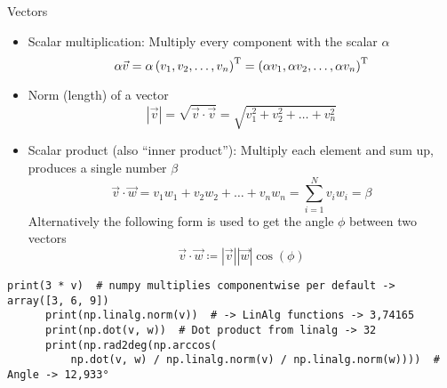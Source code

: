   \begin{frame}[fragile]{Vectors}
    \begin{itemize}
      \item Scalar multiplication:
        Multiply every component with the scalar $\alpha$
        \begin{equation*}
          \alpha \vec{v} =
            \alpha \left(v_1, v_2, \dots, v_n\right)^{\text{T}} =
            \left(\alpha v_1, \alpha v_2, \dots, \alpha v_n\right)^{\text{T}}
        \end{equation*}
      \item Norm (length) of a vector
        \begin{equation*}
          |\vec{v}| = \sqrt{\vec{v}\cdot \vec{v}} =
            \sqrt{v_1^2 + v_2^2 + \dots + v_n^2}
        \end{equation*}
      \item Scalar product (also \enquote{inner product}):
        Multiply each element and sum up, produces a single number $\beta$
        \begin{equation*}
          \vec{v}\cdot \vec{w} =
            v_1 w_1 + v_2 w_2 + \dots + v_n w_n =
            \sum_{i=1}^{N} v_i w_i = \beta
        \end{equation*}
        Alternatively the following form is used to get the angle $\phi$
          between two vectors
        \begin{equation*}
          \vec{v}\cdot \vec{w} \coloneqq |\vec{v}||\vec{w}|\cos(\phi)
        \end{equation*}
    \end{itemize}
    \begin{mdframed}
      \begin{lstlisting}[style=dark, gobble=6, title=\lsttitlelight{Vectors in numpy -- Examples for presented content}]
      print(3 * v)  # numpy multiplies componentwise per default -> array([3, 6, 9])
      print(np.linalg.norm(v))  # -> LinAlg functions -> 3,74165
      print(np.dot(v, w))  # Dot product from linalg -> 32
      print(np.rad2deg(np.arccos(
          np.dot(v, w) / np.linalg.norm(v) / np.linalg.norm(w))))  # Angle -> 12,933°
      \end{lstlisting}
    \end{mdframed}
  \end{frame}

